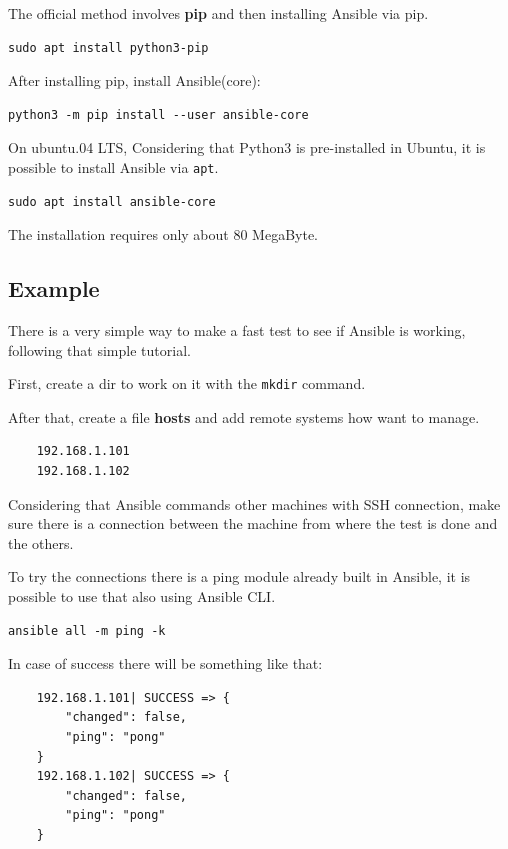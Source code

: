 \documentclass[12pt,a4paper,openright,twoside]{book}
\begin{document}
The official method involves \textbf{pip} and then installing Ansible via pip.
\begin{lstlisting}
sudo apt install python3-pip
\end{lstlisting}


After installing pip, install Ansible(core):

\begin{lstlisting}
python3 -m pip install --user ansible-core
\end{lstlisting}

On ubuntu.04 LTS,
Considering that Python3 is pre-installed in Ubuntu, it is possible to install Ansible via \texttt{apt}.

\begin{lstlisting}
sudo apt install ansible-core
\end{lstlisting}

The installation requires only about 80 MegaByte.

\subsection{Example}

There is a very simple way to make a fast test to see if Ansible is working, following that simple tutorial\cite{ansibleRIP}.


First, create a dir to work on it with the \texttt{mkdir} command.


After that, create a file \textbf{hosts} and add remote systems how want to manage.
\begin{lstlisting}
    192.168.1.101
    192.168.1.102
\end{lstlisting}

Considering that Ansible commands other machines with SSH connection, make sure there is a connection between the machine from where the test is done and the others.

To try the connections there is a ping module already built in Ansible, it is possible to use that also using Ansible CLI.
\begin{lstlisting}
ansible all -m ping -k
\end{lstlisting}

In case of success there will be something like that:
\begin{lstlisting}
    192.168.1.101| SUCCESS => {
        "changed": false, 
        "ping": "pong"
    }
    192.168.1.102| SUCCESS => {
        "changed": false, 
        "ping": "pong"
    }
\end{lstlisting}
\end{document}

